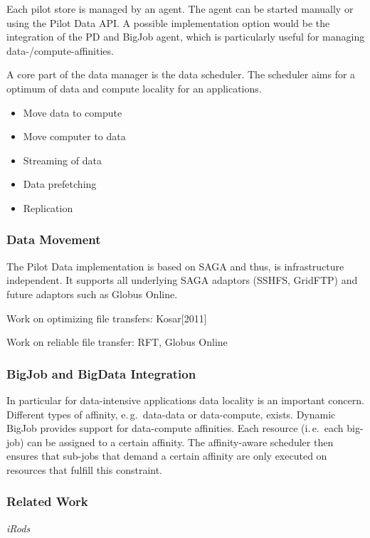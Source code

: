 \documentclass[conference,final]{IEEEtran}
\begin{document}
Each pilot store is managed by an agent. The agent can be started manually or 
using the Pilot Data API. A possible implementation option would be the 
integration of the PD and BigJob agent, which is particularly useful for 
managing data-/compute-affinities.

A core part of the data manager is the data scheduler. The scheduler aims for a 
optimum of data and compute locality for an applications.
\begin{itemize}
	\item Move data to compute
	\item Move computer to data
	\item Streaming of data
	\item Data prefetching 
	\item Replication
\end{itemize}



\subsubsection{Data Movement}

The Pilot Data implementation is based on SAGA and thus, is infrastructure
independent. It supports all underlying SAGA adaptors (SSHFS, GridFTP) and
future adaptors such as Globus Online.

Work on optimizing file transfers: Kosar[2011]

Work on reliable file transfer: RFT, Globus Online

\subsubsection{BigJob and BigData Integration}

In particular for data-intensive applications data locality is an important
concern. Different types of affinity, e.\,g.\ data-data or data-compute, exists.
Dynamic BigJob provides support for data-compute affinities. Each resource
(i.\,e.\ each big-job) can be assigned to a certain affinity. The affinity-aware
scheduler then ensures that sub-jobs that demand a certain affinity are only
executed on resources that fulfill this constraint.


\subsubsection{Related Work}

\emph{iRods}
\end{document}
